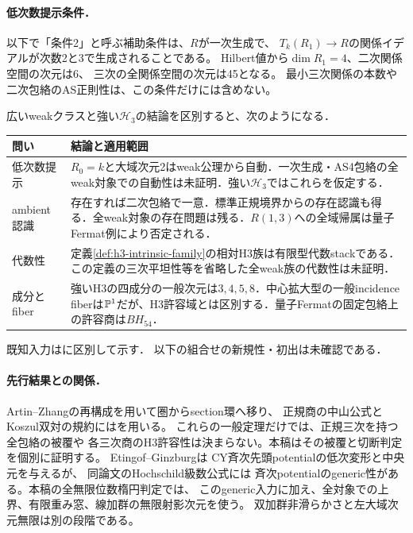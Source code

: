 \documentclass[11pt,a4paper]{ltjsarticle}
\theoremstyle{definition}\newtheorem{definition}[theorem]{定義}
\begin{document}
\paragraph{低次数提示条件．}
以下で「条件2」と呼ぶ補助条件は、$R$が一次生成で、
$T_k(R_1)\to R$の関係イデアルが次数2と3で生成されることである。
Hilbert値から$\dim R_1=4$、二次関係空間の次元は6、
三次の全関係空間の次元は45となる。
最小三次関係の本数や二次包絡のAS正則性は、この条件だけには含めない。

広いweakクラスと強い$\mathcal H_3$の結論を区別すると、次のようになる．
\begin{center}\small
\begin{tabular}{p{.15\linewidth}p{.76\linewidth}}\toprule
問い&結論と適用範囲\\\midrule
低次数提示&$R_0=k$と大域次元2はweak公理から自動．一次生成・AS4包絡の全weak対象での自動性は未証明．強い$\mathcal H_3$ではこれらを仮定する．\\
ambient認識&存在すれば二次包絡で一意．標準正規境界からの存在認識も得る．全weak対象の存在問題は残る．$R(1,3)$への全域帰属は量子Fermat例により否定される．\\
代数性&定義\ref{def:h3-intrinsic-family}の相対H3族は有限型代数stackである．この定義の三次平坦性等を省略した全weak族の代数性は未証明．\\
成分とfiber&強いH3の四成分の一般次元は$3,4,5,8$．中心拡大型の一般incidence fiberは$\mathbb P^1$だが、H3許容域とは区別する．量子Fermatの固定包絡上の許容商は$BH_{54}$．\\\bottomrule
\end{tabular}
\end{center}
既知入力は\cite{AZ,Kanazawa,YZ,Pym,AOU,BN}に区別して示す．
以下の組合せの新規性・初出は未確認である．

\paragraph{先行結果との関係．}
Artin--Zhangの再構成\cite{AZ}を用いて圏からsection環へ移り、
正規商の中山公式とKoszul双対の規約には\cite{RRZ,RRZtri}を用いる。
これらの一般定理だけでは、正規三次を持つ全包絡の被覆や
各三次商のH3許容性は決まらない。本稿はその被覆と切断判定を個別に証明する。
Etingof--Ginzburg\cite[Theorem 3.3.2]{EGdelpezzo}は
CY斉次先頭potentialの低次変形と中央元を与えるが、
同論文のHochschild級数公式\cite[Theorem 3.5.2(ii)]{EGdelpezzo}には
斉次potentialのgeneric性がある。本稿の全無限位数楕円判定では、
このgeneric入力に加え、全対象での上界、有限重み窓、線加群の無限射影次元を使う。
双加群非滑らかさと左大域次元無限は別の段階である。
\end{document}
